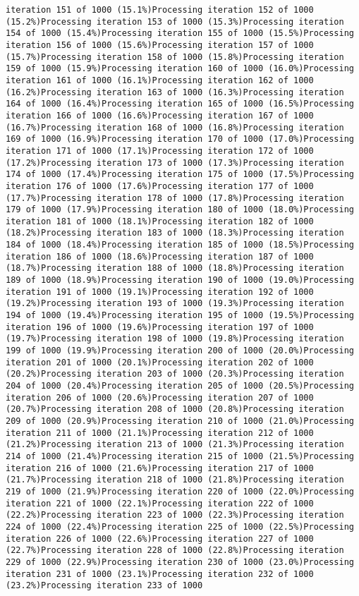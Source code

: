 \documentclass[
]{article}
\begin{document}
\begin{verbatim}
iteration 151 of 1000 (15.1%)Processing iteration 152 of 1000 (15.2%)Processing iteration 153 of 1000 (15.3%)Processing iteration 154 of 1000 (15.4%)Processing iteration 155 of 1000 (15.5%)Processing iteration 156 of 1000 (15.6%)Processing iteration 157 of 1000 (15.7%)Processing iteration 158 of 1000 (15.8%)Processing iteration 159 of 1000 (15.9%)Processing iteration 160 of 1000 (16.0%)Processing iteration 161 of 1000 (16.1%)Processing iteration 162 of 1000 (16.2%)Processing iteration 163 of 1000 (16.3%)Processing iteration 164 of 1000 (16.4%)Processing iteration 165 of 1000 (16.5%)Processing iteration 166 of 1000 (16.6%)Processing iteration 167 of 1000 (16.7%)Processing iteration 168 of 1000 (16.8%)Processing iteration 169 of 1000 (16.9%)Processing iteration 170 of 1000 (17.0%)Processing iteration 171 of 1000 (17.1%)Processing iteration 172 of 1000 (17.2%)Processing iteration 173 of 1000 (17.3%)Processing iteration 174 of 1000 (17.4%)Processing iteration 175 of 1000 (17.5%)Processing iteration 176 of 1000 (17.6%)Processing iteration 177 of 1000 (17.7%)Processing iteration 178 of 1000 (17.8%)Processing iteration 179 of 1000 (17.9%)Processing iteration 180 of 1000 (18.0%)Processing iteration 181 of 1000 (18.1%)Processing iteration 182 of 1000 (18.2%)Processing iteration 183 of 1000 (18.3%)Processing iteration 184 of 1000 (18.4%)Processing iteration 185 of 1000 (18.5%)Processing iteration 186 of 1000 (18.6%)Processing iteration 187 of 1000 (18.7%)Processing iteration 188 of 1000 (18.8%)Processing iteration 189 of 1000 (18.9%)Processing iteration 190 of 1000 (19.0%)Processing iteration 191 of 1000 (19.1%)Processing iteration 192 of 1000 (19.2%)Processing iteration 193 of 1000 (19.3%)Processing iteration 194 of 1000 (19.4%)Processing iteration 195 of 1000 (19.5%)Processing iteration 196 of 1000 (19.6%)Processing iteration 197 of 1000 (19.7%)Processing iteration 198 of 1000 (19.8%)Processing iteration 199 of 1000 (19.9%)Processing iteration 200 of 1000 (20.0%)Processing iteration 201 of 1000 (20.1%)Processing iteration 202 of 1000 (20.2%)Processing iteration 203 of 1000 (20.3%)Processing iteration 204 of 1000 (20.4%)Processing iteration 205 of 1000 (20.5%)Processing iteration 206 of 1000 (20.6%)Processing iteration 207 of 1000 (20.7%)Processing iteration 208 of 1000 (20.8%)Processing iteration 209 of 1000 (20.9%)Processing iteration 210 of 1000 (21.0%)Processing iteration 211 of 1000 (21.1%)Processing iteration 212 of 1000 (21.2%)Processing iteration 213 of 1000 (21.3%)Processing iteration 214 of 1000 (21.4%)Processing iteration 215 of 1000 (21.5%)Processing iteration 216 of 1000 (21.6%)Processing iteration 217 of 1000 (21.7%)Processing iteration 218 of 1000 (21.8%)Processing iteration 219 of 1000 (21.9%)Processing iteration 220 of 1000 (22.0%)Processing iteration 221 of 1000 (22.1%)Processing iteration 222 of 1000 (22.2%)Processing iteration 223 of 1000 (22.3%)Processing iteration 224 of 1000 (22.4%)Processing iteration 225 of 1000 (22.5%)Processing iteration 226 of 1000 (22.6%)Processing iteration 227 of 1000 (22.7%)Processing iteration 228 of 1000 (22.8%)Processing iteration 229 of 1000 (22.9%)Processing iteration 230 of 1000 (23.0%)Processing iteration 231 of 1000 (23.1%)Processing iteration 232 of 1000 (23.2%)Processing iteration 233 of 1000 
\end{verbatim}
\end{document}
